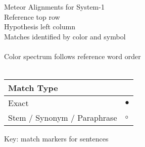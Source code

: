 \documentclass[landscape]{article}
\newcommand{\ssp}{\hspace{2pt}}
\newcommand{\mex}{\cellcolor{g}$\bullet$}
\newcommand{\map}{\cellcolor{y}$\boldsymbol\circ$}
\begin{document}
\noindent\large Meteor Alignments for System-1\\

\noindent\normalsize Reference top row\\
Hypothesis left column\\
Matches identified by color and symbol\\\\
Color spectrum follows reference word order\\\\

\small
\noindent\begin{tabular}{|l|p{10pt}|}
\hline
Match Type&\\
\hline
Exact&\ssp\mex\\
\hline
Stem / Synonym / Paraphrase&\ssp\map\\
\hline
\end{tabular}

\vspace{6pt}
\noindent Key: match markers for sentences
\newpage
\end{document}
